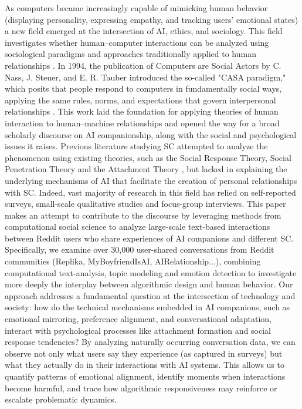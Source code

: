 \documentclass{article}
\begin{document}
As computers became increasingly capable of mimicking human behavior (displaying personality, expressing empathy, and tracking users’ emotional states) a new field emerged at the intersection of AI, ethics, and sociology. This field investigates whether human–computer interactions can be analyzed using sociological paradigms and approaches traditionally applied to human relationships \cite{inproceedings}. In 1994, the publication of Computers are Social Actors by C. Nass, J. Steuer, and E. R. Tauber introduced the so-called "CASA paradigm," which posits that people respond to computers in fundamentally social ways, applying the same rules, norms, and expectations that govern interpersonal relationships \cite{10.1145/259963.260288,article}. This work laid the foundation for applying theories of human interaction to human–machine relationships and opened the way for a broad scholarly discourse on AI companionship, along with the social and psychological issues it raises. Previous literature studying SC attempted to analyze the phenomenon using existing theories, such as the Social Response Theory, Social Penetration Theory and the Attachment Theory \cite{inproceedings, article1, article2}, but lacked in explaining the underlying mechanisms of AI that facilitate the creation of personal relationships with SC.  Indeed, vast majority of research in this field has relied on self-reported surveys, small-scale qualitative studies and focus-group interviews. This paper makes an attempt to contribute to the discourse by leveraging methods from computational social science to analyze large-scale text-based interactions between Reddit users who share experiences of AI companions and different SC. 
Specifically, we examine over 30,000 user-shared conversations from Reddit communities (Replika, MyBoyfriendIsAI, AIRelationship...), combining computational text-analysis, topic modeling and emotion detection to investigate more deeply the interplay between algorithmic design and human behavior. 
Our approach addresses a fundamental question at the intersection of technology and society: how do the technical mechanisms embedded in AI companions, such as emotional mirroring, preference alignment, and conversational adaptation, interact with psychological processes like attachment formation and social response tendencies? By analyzing naturally occurring conversation data, we can observe not only what users say they experience (as captured in surveys) but what they actually do in their interactions with AI systems. This allows us to quantify patterns of emotional alignment, identify moments when interactions become harmful, and trace how algorithmic responsiveness may reinforce or escalate problematic dynamics.
\end{document}
